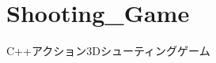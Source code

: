 \chapter{Shooting\+\_\+\+Game }
\hypertarget{md__r_e_a_d_m_e}{}\label{md__r_e_a_d_m_e}
\label{md__r_e_a_d_m_e_autotoc_md0}%
%


C++アクション3\+Dシューティングゲーム 